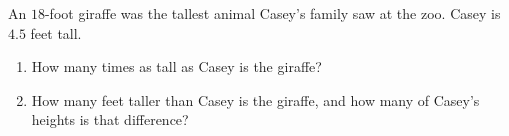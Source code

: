 An $18$-foot giraffe was the tallest animal Casey's family saw at the zoo. Casey is $4.5$ feet tall.
\begin{enumerate}
\item[(a)] How many times as tall as Casey is the giraffe?
\item[(b)] How many feet taller than Casey is the giraffe, and how many of Casey's heights is that difference?
\end{enumerate}
